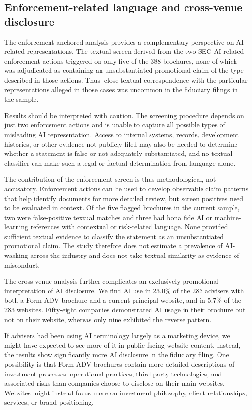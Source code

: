 \documentclass[utf8]{FrontiersinHarvard}
\begin{document}
\subsection{Enforcement-related language and cross-venue disclosure}

The enforcement-anchored analysis provides a complementary perspective on AI-related representations. The textual screen derived from the two SEC AI-related enforcement actions triggered on only five of the 388 brochures, none of which was adjudicated as containing an unsubstantiated promotional claim of the type described in those actions. Thus, close textual correspondence with the particular representations alleged in those cases was uncommon in the fiduciary filings in the sample.

Results should be interpreted with caution. The screening procedure depends on just two enforcement actions and is unable to capture all possible types of misleading AI representation. Access to internal systems, records, development histories, or other evidence not publicly filed may also be needed to determine whether a statement is false or not adequately substantiated, and no textual classifier can make such a legal or factual determination from language alone.

The contribution of the enforcement screen is thus methodological, not accusatory. Enforcement actions can be used to develop observable claim patterns that help identify documents for more detailed review, but screen positives need to be evaluated in context. Of the five flagged brochures in the current sample, two were false-positive textual matches and three had bona fide AI or machine-learning references with contextual or risk-related language. None provided sufficient textual evidence to classify the statement as an unsubstantiated promotional claim. The study therefore does not estimate a prevalence of AI-washing across the industry and does not take textual similarity as evidence of misconduct.

The cross-venue analysis further complicates an exclusively promotional interpretation of AI disclosure. We find AI use in 23.0\% of the 283 advisers with both a Form ADV brochure and a current principal website, and in 5.7\% of the 283 websites. Fifty-eight companies demonstrated AI usage in their brochure but not on their website, whereas only nine exhibited the reverse pattern.

If advisers had been using AI terminology largely as a marketing device, we might have expected to see more of it in public-facing website content. Instead, the results show significantly more AI disclosure in the fiduciary filing. One possibility is that Form ADV brochures contain more detailed descriptions of investment processes, operational practices, third-party technologies, and associated risks than companies choose to disclose on their main websites. Websites might instead focus more on investment philosophy, client relationships, services, or brand positioning.
\end{document}
